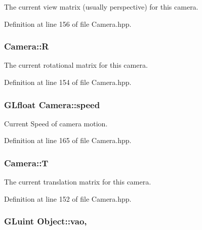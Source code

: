 The current view matrix (usually perspective) for this camera. 



Definition at line 156 of file Camera.\-hpp.

\hypertarget{class_camera_a8fd028120b18556c43ad86756e637fbc}{
\subsubsection[{R}]{ Camera\-::\-R\hspace{0.3cm}{\ttfamily [private]}}}\label{class_camera_a8fd028120b18556c43ad86756e637fbc}


The current rotational matrix for this camera. 



Definition at line 154 of file Camera.\-hpp.

\hypertarget{class_camera_a308e92b5d3ef0eea5cac7745df6e28f4}{
\subsubsection[{speed}]{\setlength{\rightskip}{0pt plus 5cm}G\-Lfloat Camera\-::speed\hspace{0.3cm}{\ttfamily [private]}}}\label{class_camera_a308e92b5d3ef0eea5cac7745df6e28f4}


Current Speed of camera motion. 



Definition at line 165 of file Camera.\-hpp.

\hypertarget{class_camera_aa4cb92b539c9a9707a12d7025ed889f6}{
\subsubsection[{T}]{ Camera\-::\-T\hspace{0.3cm}{\ttfamily [private]}}}\label{class_camera_aa4cb92b539c9a9707a12d7025ed889f6}


The current translation matrix for this camera. 



Definition at line 152 of file Camera.\-hpp.

\hypertarget{class_object_a66190fee29d03d6478516686cbd01eb8}{
\subsubsection[{vao}]{\setlength{\rightskip}{0pt plus 5cm}G\-Luint Object\-::vao\hspace{0.3cm}{\ttfamily [protected]}, {\ttfamily [inherited]}}}\label{class_object_a66190fee29d03d6478516686cbd01eb8}


